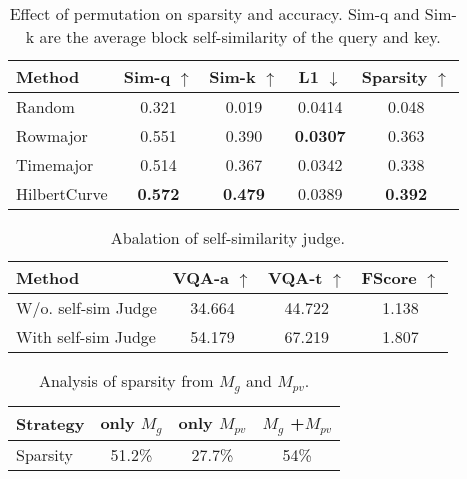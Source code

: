 \begin{table}[!th]
    \centering
    \small
    \vspace{-.5em}
    \caption{Effect of permutation on sparsity and accuracy. Sim-q and Sim-k are the average block self-similarity of the query and key.}
    \begin{tabular}{l|c|c|c|c}
        \toprule
        \textbf{Method} &\textbf{Sim-q} \(\uparrow\) & \textbf{Sim-k} \(\uparrow\) & \textbf{L1} \(\downarrow\) & \textbf{Sparsity} \(\uparrow\) \\
        \midrule
        Random      & 0.321             & 0.019             & 0.0414            &  0.048 \\
        Rowmajor    & 0.551             & 0.390             & \textbf{0.0307}   &  0.363 \\
        Timemajor   & 0.514             & 0.367             & 0.0342            &  0.338 \\
        HilbertCurve& \textbf{0.572}    & \textbf{0.479}    & 0.0389            &  \textbf{0.392}\\
        \bottomrule
    \end{tabular}
    \label{tab:permutation}
    \vspace{-1em}
\end{table}


\begin{table}[!th]
    \centering
    \small
    \vspace{-.5em}
    \caption{Abalation of self-similarity judge.}
    \setlength\tabcolsep{7pt}
    \begin{tabular}{l|c|c|c}
        \toprule
        \textbf{Method} &{\bf VQA-a $\uparrow$}  & {\bf VQA-t $\uparrow$}  & {\bf FScore $\uparrow$} \\
        \midrule
        W/o. self-sim Judge  & 34.664 & 44.722 & 1.138  \\
        With self-sim Judge & 54.179 & 67.219 & 1.807  \\
        \bottomrule
    \end{tabular}
    \label{tab:ablation_self_sim}
    \vspace{-1em}
\end{table}


\begin{table}[!th]
    \centering
    \small
    \vspace{-.5em}
    \caption{Analysis of sparsity from $M_g$ and $M_{pv}$.}
    \setlength\tabcolsep{12.3pt}
    \begin{tabular}{l|c|c|c}
        \toprule
        Strategy & {only $M_g$}  & {only $M_{pv}$}  & {$M_g$ +$M_{pv}$} \\
        \midrule
        Sparsity  & 51.2\%	 & 27.7\% & 54\%  \\
        \bottomrule
    \end{tabular}
    \label{tab:sparsity_of_g_pv}
    \vspace{-1.2em}
\end{table}


